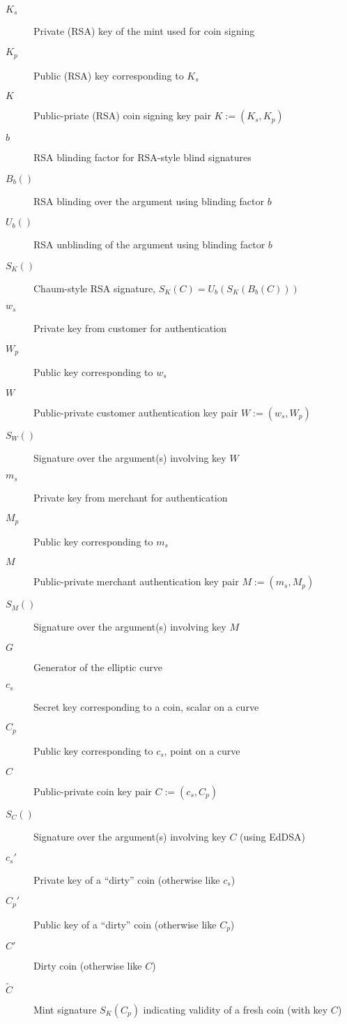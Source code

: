 \documentclass{llncs}
\begin{document}
\begin{description}
  \item[$K_s$]{Private (RSA) key of the mint used for coin signing}
  \item[$K_p$]{Public (RSA) key corresponding to $K_s$}
  \item[$K$]{Public-priate (RSA) coin signing key pair $K := (K_s, K_p)$}
  \item[$b$]{RSA blinding factor for RSA-style blind signatures}
  \item[$B_b()$]{RSA blinding over the argument using blinding factor $b$}
  \item[$U_b()$]{RSA unblinding of the argument using blinding factor $b$}
  \item[$S_K()$]{Chaum-style RSA signature, $S_K(C) = U_b(S_K(B_b(C)))$}
  \item[$w_s$]{Private key from customer for authentication}
  \item[$W_p$]{Public key corresponding to $w_s$}
  \item[$W$]{Public-private customer authentication key pair $W := (w_s, W_p)$}
  \item[$S_W()$]{Signature over the argument(s) involving key $W$}
  \item[$m_s$]{Private key from merchant for authentication}
  \item[$M_p$]{Public key corresponding to $m_s$}
  \item[$M$]{Public-private merchant authentication key pair $M := (m_s, M_p)$}
  \item[$S_M()$]{Signature over the argument(s) involving key $M$}
  \item[$G$]{Generator of the elliptic curve}
  \item[$c_s$]{Secret key corresponding to a coin, scalar on a curve}
  \item[$C_p$]{Public key corresponding to $c_s$, point on a curve}
  \item[$C$]{Public-private coin key pair $C := (c_s, C_p)$}
  \item[$S_{C}()$]{Signature over the argument(s) involving key $C$ (using EdDSA)}
  \item[$c_s'$]{Private key of a ``dirty'' coin (otherwise like $c_s$)}
  \item[$C_p'$]{Public key of a ``dirty'' coin (otherwise like $C_p$)}
  \item[$C'$]{Dirty coin (otherwise like $C$)}
  \item[$\widetilde{C}$]{Mint signature $S_K(C_p)$ indicating validity of a fresh coin (with key $C$)}

\end{description}
\end{document}
